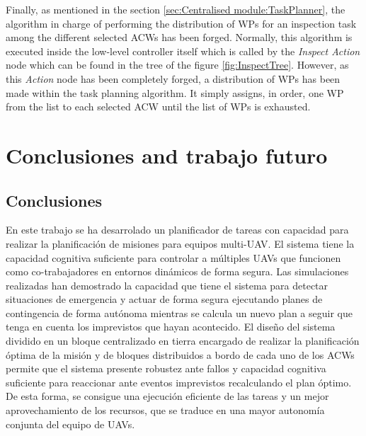 \documentclass[fontsize=11pt, English=false, Español=true, Myfinal=true, twoside, numbers=noenddot]{scrbook}
\begin{document}
Finally, as mentioned in the section \ref{sec:Centralised module:TaskPlanner}, the algorithm in charge of performing the distribution of \glspl{WP} for an inspection task among the different selected \glspl{ACW} has been forged. Normally, this algorithm is executed inside the low-level controller itself which is called by the \emph{Inspect Action} node which can be found in the tree of the figure \ref{fig:InspectTree}. However, as this \emph{Action} node has been completely forged, a distribution of \glspl{WP} has been made within the task planning algorithm. It simply assigns, in order, one \gls{WP} from the list to each selected \gls{ACW} until the list of \glspl{WP} is exhausted.
%
%
%
% 
\chapter{Conclusiones and trabajo futuro}
\label{ch:ConclusionsAndFutureWork}
\section{Conclusiones}
\label{sec:Conclusions}
En este trabajo se ha desarrolado un planificador de tareas con capacidad para realizar la planificación de misiones para equipos multi-UAV. El sistema tiene la capacidad cognitiva suficiente para controlar a múltiples UAVs que funcionen como co-trabajadores en entornos dinámicos de forma segura. Las simulaciones realizadas han demostrado la capacidad que tiene el sistema para detectar situaciones de emergencia y actuar de forma segura ejecutando planes de contingencia de forma autónoma mientras se calcula un nuevo plan a seguir que tenga en cuenta los imprevistos que hayan acontecido. El diseño del sistema dividido en un bloque centralizado en tierra encargado de realizar la planificación óptima de la misión y de bloques distribuidos a bordo de cada uno de los ACWs permite que el sistema presente robustez ante fallos y capacidad cognitiva suficiente para reaccionar ante eventos imprevistos recalculando el plan óptimo. De esta forma, se consigue una ejecución eficiente de las tareas y un mejor aprovechamiento de los recursos, que se traduce en una mayor autonomía conjunta del equipo de UAVs.
\end{document}
